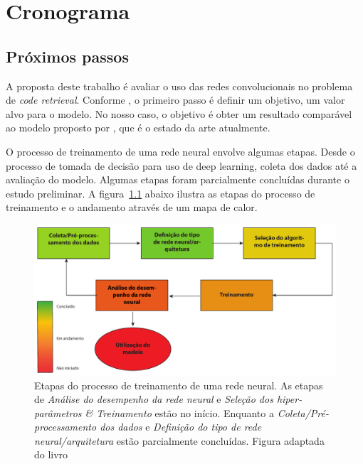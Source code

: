 \chapter{Cronograma}
\label{cap:cronograma}

\section{Próximos passos}

A proposta deste trabalho é avaliar o uso das redes convolucionais no problema de \textit{code retrieval}. Conforme \cite{Goodfellow-et-al-2016:pratical-methodology}, o primeiro passo é definir um objetivo, um valor alvo para o modelo. No nosso caso, o objetivo é obter um resultado comparável ao modelo proposto por \cite{cambronero-deep-learning-code-search:2019}, que é o estado da arte atualmente.

O processo de treinamento de uma rede neural envolve algumas etapas. Desde o processo de tomada de decisão para uso de deep learning, coleta dos dados até a avaliação do modelo. Algumas etapas foram parcialmente concluídas durante o estudo preliminar. A figura~\ref{fig:neural-network-process-training} abaixo ilustra as etapas do processo de treinamento e o andamento através de um mapa de calor.


\begin{figure}[h]
    \centering
    \includegraphics[width=1\textwidth]{figuras/cap-cronograma/training_process.pdf}
    \caption{Etapas do processo de treinamento de uma rede neural. As etapas de \emph{Análise do desempenho da rede neural} e \emph{Seleção dos hiper-parâmetros \& Treinamento} estão no início. Enquanto a \emph{Coleta/Pré-processamento dos dados} e \emph{Definição do tipo de rede neural/arquitetura} estão parcialmente concluídas. Figura adaptada do livro \cite{nndesign:2014:pratical-training-issues}}
    \label{fig:neural-network-process-training}
\end{figure}

